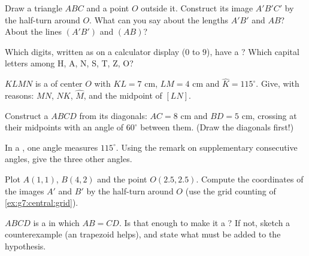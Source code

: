 \begin{exercise}[$\star$]\label{exo:g7:central:2}
Draw a triangle $ABC$ and a point $O$ outside it. Construct its image
$A'B'C'$ by the half-turn around $O$. What can you say about the
lengths $A'B'$ and $AB$? About the lines $(A'B')$ and $(AB)$?
\end{exercise}

\begin{exercise}[$\star$]\label{exo:g7:central:3}
Which digits, written as on a calculator display ($0$ to $9$), have a
? Which capital letters among H, A, N, S, T, Z, O?
\end{exercise}

\begin{exercise}[$\star$]\label{exo:g7:central:4}
$KLMN$ is a  of center $O$ with $KL = 7$ cm,
$LM = 4$ cm and $\widehat K = 115^\circ$. Give, with reasons: $MN$,
$NK$, $\widehat M$, and the midpoint of $[LN]$.
\end{exercise}

\begin{exercise}[$\star$]\label{exo:g7:central:5}
Construct a  $ABCD$ from its diagonals: $AC = 8$ cm and
$BD = 5$ cm, crossing at their midpoints with an angle of $60^\circ$
between them. (Draw the diagonals first!)
\end{exercise}

\begin{exercise}[$\star$]\label{exo:g7:central:6}
In a , one angle measures $115^\circ$. Using the remark
on supplementary consecutive angles, give the three other angles.
\end{exercise}

\begin{exercise}[$\star\star$]\label{exo:g7:central:7}
Plot $A(1, 1)$, $B(4, 2)$ and the point $O(2.5, 2.5)$. Compute the
coordinates of the images $A'$ and $B'$ by the half-turn around $O$
(use the grid counting of \cref{ex:g7:central:grid}).
\end{exercise}

\begin{exercise}[$\star\star$]\label{exo:g7:central:8}
$ABCD$ is a  in which $AB = CD$. Is that enough to make
it a ? If not, sketch a counterexample (an 
trapezoid helps), and state what must be added to the hypothesis.
\end{exercise}

